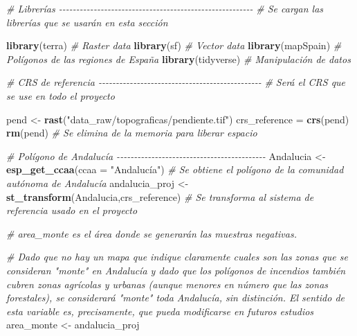 \documentclass[12pt,a4paper,]{book}
\newenvironment{Shaded}{\begin{snugshade}}{\end{snugshade}}
\newcommand{\AttributeTok}[1]{\textcolor[rgb]{0.13,0.29,0.53}{#1}}
\newcommand{\CommentTok}[1]{\textcolor[rgb]{0.56,0.35,0.01}{\textit{#1}}}
\newcommand{\FunctionTok}[1]{\textcolor[rgb]{0.13,0.29,0.53}{\textbf{#1}}}
\newcommand{\NormalTok}[1]{#1}
\newcommand{\OtherTok}[1]{\textcolor[rgb]{0.56,0.35,0.01}{#1}}
\newcommand{\StringTok}[1]{\textcolor[rgb]{0.31,0.60,0.02}{#1}}
\numberwithin{dummy}{section}
\theoremstyle{ocrenumbox}
\theoremstyle{blacknumex}
\theoremstyle{blacknumbox}
\theoremstyle{ocrenum}
\theoremstyle{ocrenum}
\begin{document}
\begin{Shaded}
\begin{Highlighting}[]
\CommentTok{\# Librerías {-}{-}{-}{-}{-}{-}{-}{-}{-}{-}{-}{-}{-}{-}{-}{-}{-}{-}{-}{-}{-}{-}{-}{-}{-}{-}{-}{-}{-}{-}{-}{-}{-}{-}{-}{-}{-}{-}{-}{-}{-}{-}{-}{-}{-}{-}{-}{-}{-}{-}{-}{-}{-}{-}{-}{-}  }
\CommentTok{\# Se cargan las librerías que se usarán en esta sección}

\FunctionTok{library}\NormalTok{(terra) }\CommentTok{\# Raster data}
\FunctionTok{library}\NormalTok{(sf) }\CommentTok{\# Vector data}
\FunctionTok{library}\NormalTok{(mapSpain) }\CommentTok{\# Polígonos de las regiones de España}
\FunctionTok{library}\NormalTok{(tidyverse) }\CommentTok{\# Manipulación de datos}



\CommentTok{\# CRS de referencia {-}{-}{-}{-}{-}{-}{-}{-}{-}{-}{-}{-}{-}{-}{-}{-}{-}{-}{-}{-}{-}{-}{-}{-}{-}{-}{-}{-}{-}{-}{-}{-}{-}{-}{-}{-}{-}{-}{-}{-}{-}{-}{-}{-}{-}{-}{-}}
\CommentTok{\# Será el CRS que se use en todo el proyecto}

\NormalTok{pend }\OtherTok{\textless{}{-}} \FunctionTok{rast}\NormalTok{(}\StringTok{"data\_raw/topograficas/pendiente.tif"}\NormalTok{)}
\NormalTok{crs\_reference }\OtherTok{=} \FunctionTok{crs}\NormalTok{(pend)}
\FunctionTok{rm}\NormalTok{(pend) }\CommentTok{\# Se elimina de la memoria para liberar espacio}


\CommentTok{\# Polígono de Andalucía {-}{-}{-}{-}{-}{-}{-}{-}{-}{-}{-}{-}{-}{-}{-}{-}{-}{-}{-}{-}{-}{-}{-}{-}{-}{-}{-}{-}{-}{-}{-}{-}{-}{-}{-}{-}{-}{-}{-}{-}{-}{-}{-}}
\NormalTok{Andalucia }\OtherTok{\textless{}{-}} \FunctionTok{esp\_get\_ccaa}\NormalTok{(}\AttributeTok{ccaa =} \StringTok{"Andalucía"}\NormalTok{) }\CommentTok{\# Se obtiene el polígono de la comunidad autónoma de Andalucía}
\NormalTok{andalucia\_proj }\OtherTok{\textless{}{-}} \FunctionTok{st\_transform}\NormalTok{(Andalucia,crs\_reference) }\CommentTok{\# Se transforma al sistema de referencia usado en el proyecto}

\CommentTok{\# area\_monte es el área donde se generarán las muestras negativas.}

\CommentTok{\# Dado que no hay un mapa que indique claramente cuales son las zonas que se consideran "monte" en Andalucía y dado que los polígonos de incendios también cubren zonas agrícolas y urbanas (aunque menores en número que las zonas forestales), se considerará "monte" toda Andalucía, sin distinción. El sentido de esta variable es, precisamente, que pueda modificarse en futuros estudios}
\NormalTok{area\_monte }\OtherTok{\textless{}{-}}\NormalTok{ andalucia\_proj}


\end{Highlighting}
\end{Shaded}
\end{document}
